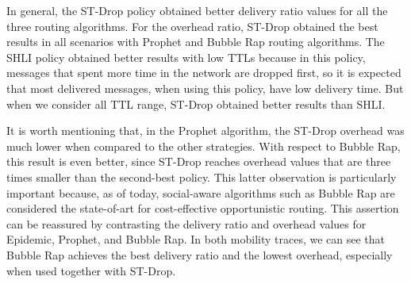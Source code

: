 In general, the ST-Drop policy obtained better delivery ratio values for all the three routing algorithms. For the overhead ratio, ST-Drop obtained the best results in all scenarios with Prophet and Bubble Rap routing algorithms. The SHLI policy obtained better results with low TTLs because in this policy, messages that spent more time in the network are dropped first, so it is expected that most delivered messages, when using this policy, have low delivery time. But when we consider all TTL range, ST-Drop obtained better results than SHLI.

It is worth mentioning that, in the Prophet algorithm, the ST-Drop overhead was much lower when compared to the other strategies. With respect to Bubble Rap, this result is even better, since ST-Drop reaches overhead values that are three times smaller than the second-best policy. This latter observation is particularly important because, as of today, social-aware algorithms such as Bubble Rap are considered the state-of-art for cost-effective opportunistic routing. This assertion can be reassured by contrasting the delivery ratio and overhead values for Epidemic, Prophet, and Bubble Rap. In both mobility traces, we can see that Bubble Rap achieves the best delivery ratio and the lowest overhead, especially when used together with ST-Drop.